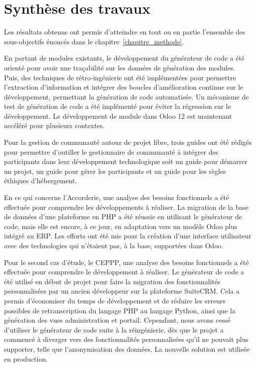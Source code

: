 \label{sec:Conclusion}

\section{Synthèse des travaux}
Les résultats obtenus ont permis d’atteindre en tout ou en partie l’ensemble des sous-objectifs énoncés dans le chapitre~\ref{chapitre_methode}.

En partant de modules existants, le développement du générateur de code a été orienté pour avoir une traçabilité sur les données de génération des modules. Puis, des techniques de rétro-ingénierie ont été implémentées pour permettre l'extraction d'information et intégrer des boucles d'amélioration continue sur le développement, permettant la génération de code automatisée. Un mécanisme de test de génération de code a été implémenté pour éviter la régression sur le développement. Le développement de module dans Odoo 12 est maintenant accéléré pour plusieurs contextes.

Pour la gestion de communauté autour de projet libre, trois guides ont été rédigés pour permettre d'outiller le gestionnaire de communauté à intégrer des participants dans leur développement technologique soit un guide pour démarrer un projet, un guide pour gérer les participants et un guide pour les règles éthiques d'hébergement.

En ce qui concerne l'Accorderie, une analyse des besoins fonctionnels a été effectuée pour comprendre les développements à réaliser. La migration de la base de données d'une plateforme en PHP a été réussie en utilisant le générateur de code, mais elle est encore, à ce jour, en adaptation vers un modèle Odoo plus intégré au ERP. Les efforts ont été mis pour la création d’une interface utilisateur avec des technologies qui n’étaient pas, à la base, supportées dans Odoo.

Pour le second cas d'étude, le CEPPP, une analyse des besoins fonctionnels a été effectuée pour comprendre le développement à réaliser. Le générateur de code a été utilisé en début de projet pour faire la migration des fonctionnalités personnalisées par un ancien développeur sur la plateforme SuiteCRM. Cela a permis d'économiser du temps de développement et de réduire les erreurs possibles de retranscription du langage PHP au langage Python, ainsi que la génération des vues administration et portail. Cependant, nous avons cessé d'utiliser le générateur de code suite à la réingénierie, dès que le projet a commencé à diverger vers des fonctionnalités personnalisées qu’il ne pouvait plus supporter, telle que l'anonymisation des données. La nouvelle solution est utilisée en production.

